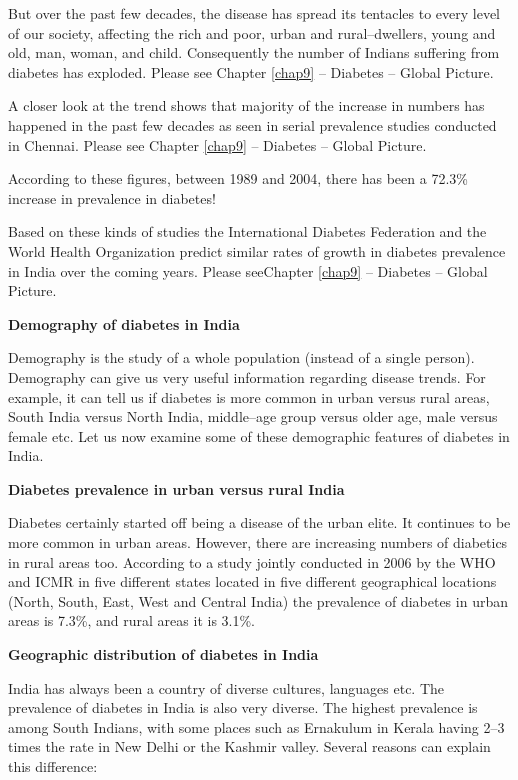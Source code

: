 But over the past few decades, the disease has spread its tentacles to every level of our society, affecting the rich and poor, urban and rural–dwellers, young and old, man, woman, and child. Consequently the number of Indians suffering from diabetes has exploded. Please see Chapter \ref{chap9} – Diabetes – Global Picture.

A closer look at the trend shows that majority of the increase in numbers has happened in the past few decades as seen in serial prevalence studies conducted in Chennai. Please see Chapter \ref{chap9} – Diabetes – Global Picture.

According to these figures, between 1989 and 2004, there has been a 72.3\% increase in prevalence in diabetes!

Based on these kinds of studies the International Diabetes Federation and the World Health Organization predict similar rates of growth in diabetes prevalence in India over the coming years. Please see\break Chapter \ref{chap9} – Diabetes – Global Picture.

\noindent\textbf{Demography of diabetes in India}

Demography is the study of a whole population (instead of a single person). Demography can give us very useful information regarding disease trends. For example, it can tell us if diabetes is more common in urban versus rural areas, South India versus North India, middle–age group versus older age, male versus female etc. Let us now examine some of these demographic features of diabetes in India.

\noindent\textbf{Diabetes prevalence in urban versus rural India}

Diabetes certainly started off being a disease of the urban elite. It continues to be more common in urban areas. However, there are increasing numbers of diabetics in rural areas too. According to a study jointly conducted in 2006 by the WHO and ICMR in five different states located in five different geographical locations (North, South, East, West and Central India) the prevalence of diabetes in urban areas is 7.3\%, and rural areas it is 3.1\%.

\noindent\textbf{Geographic distribution of diabetes in India}

India has always been a country of diverse cultures, languages etc. The prevalence of diabetes in India is also very diverse. The highest prevalence is among South Indians, with some places such as Ernakulum in Kerala having 2–3 times the rate in New Delhi or the Kashmir valley. Several reasons can explain this difference:

